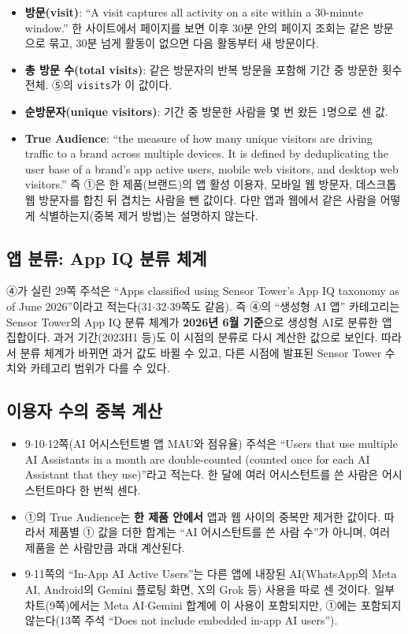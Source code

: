 \documentclass[11pt]{article}
\begin{document}
\begin{itemize}
  \item \textbf{방문(visit)}: ``A visit captures all activity on a site within a 30-minute window.'' 한 사이트에서 페이지를 보면 이후 30분 안의 페이지 조회는 같은 방문으로 묶고, 30분 넘게 활동이 없으면 다음 활동부터 새 방문이다.
  \item \textbf{총 방문 수(total visits)}: 같은 방문자의 반복 방문을 포함해 기간 중 방문한 횟수 전체. ⑤의 \texttt{visits}가 이 값이다.
  \item \textbf{순방문자(unique visitors)}: 기간 중 방문한 사람을 몇 번 왔든 1명으로 센 값.
  \item \textbf{True Audience}: ``the measure of how many unique visitors are driving traffic to a brand across multiple devices. It is defined by deduplicating the user base of a brand's app active users, mobile web visitors, and desktop web visitors.'' 즉 ①은 한 제품(브랜드)의 앱 활성 이용자, 모바일 웹 방문자, 데스크톱 웹 방문자를 합친 뒤 겹치는 사람을 뺀 값이다. 다만 앱과 웹에서 같은 사람을 어떻게 식별하는지(중복 제거 방법)는 설명하지 않는다.
\end{itemize}

\subsection{앱 분류: App IQ 분류 체계}

④가 실린 29쪽 주석은 ``Apps classified using Sensor Tower's App IQ taxonomy as of June 2026''이라고 적는다(31$\cdot$32$\cdot$39쪽도 같음). 즉 ④의 ``생성형 AI 앱'' 카테고리는 Sensor Tower의 App IQ 분류 체계가 \textbf{2026년 6월 기준}으로 생성형 AI로 분류한 앱 집합이다. 과거 기간(2023H1 등)도 이 시점의 분류로 다시 계산한 값으로 보인다. 따라서 분류 체계가 바뀌면 과거 값도 바뀔 수 있고, 다른 시점에 발표된 Sensor Tower 수치와 카테고리 범위가 다를 수 있다.

\subsection{이용자 수의 중복 계산}

\begin{itemize}
  \item 9$\cdot$10$\cdot$12쪽(AI 어시스턴트별 앱 MAU와 점유율) 주석은 ``Users that use multiple AI Assistants in a month are double-counted (counted once for each AI Assistant that they use)''라고 적는다. 한 달에 여러 어시스턴트를 쓴 사람은 어시스턴트마다 한 번씩 센다.
  \item ①의 True Audience는 \textbf{한 제품 안에서} 앱과 웹 사이의 중복만 제거한 값이다. 따라서 제품별 ① 값을 더한 합계는 ``AI 어시스턴트를 쓴 사람 수''가 아니며, 여러 제품을 쓴 사람만큼 과대 계산된다.
  \item 9$\cdot$11쪽의 ``In-App AI Active Users''는 다른 앱에 내장된 AI(WhatsApp의 Meta AI, Android의 Gemini 플로팅 화면, X의 Grok 등) 사용을 따로 센 것이다. 일부 차트(9쪽)에서는 Meta AI$\cdot$Gemini 합계에 이 사용이 포함되지만, ①에는 포함되지 않는다(13쪽 주석 ``Does not include embedded in-app AI users'').
\end{itemize}
\end{document}
